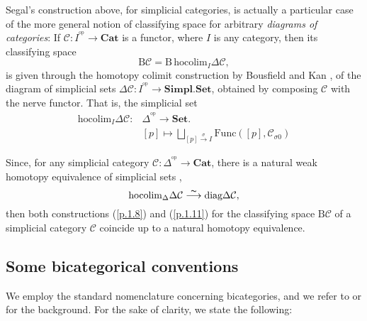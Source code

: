 \documentclass[]{amsart}
\begin{document}
Segal's construction above, for simplicial categories, is actually  a particular case of the more
general notion of classifying space for arbitrary {\em diagrams of categories}: If ${\ensuremath{\mathcal{C}}}:
I^{{^\mathrm{op}}}\to {\ensuremath{\mathbf{Cat}}}$ is a functor,  where $I$ is any category, then its classifying space
\begin{equation}\label{p.1.11} {\ensuremath{\mathrm{B}}}{\ensuremath{\mathcal{C}}}={\ensuremath{\mathrm{B}}}\,{\ensuremath{\mathrm{hocolim}}}_I\Delta{\ensuremath{\mathcal{C}}}, \end{equation}
is given through the homotopy colimit construction by Bousfield and Kan \cite[\S
XII]{bousfield-kan}, of the diagram of simplicial sets $\Delta {\ensuremath{\mathcal{C}}}:I^{{^\mathrm{op}}}\to {\ensuremath{\mathbf{Simpl.Set}}}$,
obtained by composing ${\ensuremath{\mathcal{C}}}$ with the nerve functor. That is, the simplicial set
$$ \begin{array}{ll} {\ensuremath{\mathrm{hocolim}}}_I\Delta{\ensuremath{\mathcal{C}}}:&   \Delta^{\!{^\mathrm{op}}}\longrightarrow {\ensuremath{\mathbf{Set}}}. \\[4pt]
& [p] \mapsto \bigsqcup\limits_{[p]\overset{\sigma}\to I} {\ensuremath{\mathrm{Func}}}([p],{\ensuremath{\mathcal{C}}}_{\sigma 0})\end{array} $$

Since, for any simplicial category ${\ensuremath{\mathcal{C}}}:\Delta^{\!{^\mathrm{op}}}\to {\ensuremath{\mathbf{Cat}}}$, there is a natural weak
homotopy equivalence of simplicial sets \cite[XII, 4.3]{bousfield-kan},
\begin{equation}\label{bk}\mbox{hocolim}_\Delta\Delta{\ensuremath{\mathcal{C}}}\overset{\thicksim}\longrightarrow \mbox{diag}\Delta{\mathcal C},\end{equation} then
both constructions (\ref{p.1.8}) and (\ref{p.1.11}) for the classifying space ${\ensuremath{\mathrm{B}}}{\ensuremath{\mathcal{C}}}$ of a
simplicial category ${\mathcal C}$ coincide up to a natural homotopy equivalence.

\subsection{Some bicategorical conventions}

 We employ the standard nomenclature concerning bicategories, and we refer to \cite{benabou,duskin,g-p-s,gurski} or \cite{street} for the background. For the sake of clarity, we state the following:
\end{document}

